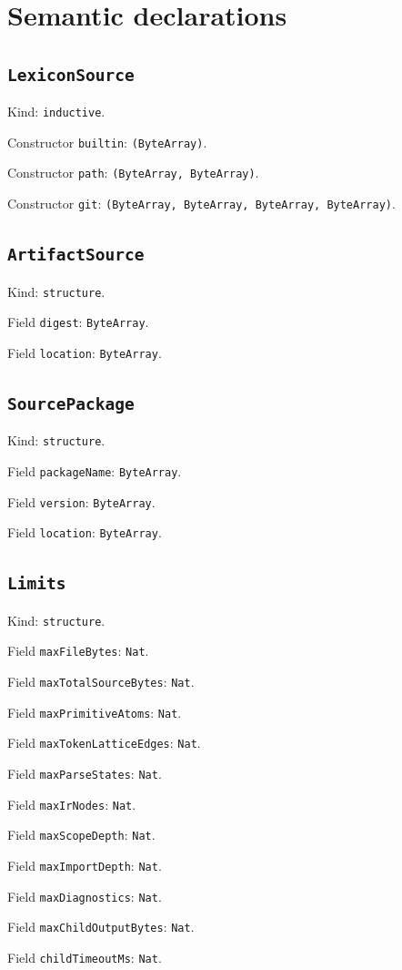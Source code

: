\documentclass[11pt]{article}
\begin{document}
\section*{Semantic declarations}
\subsection*{\texttt{LexiconSource}}
\noindent Kind: \texttt{inductive}.\par
\noindent Constructor \texttt{builtin}: \texttt{(ByteArray)}.\par
\noindent Constructor \texttt{path}: \texttt{(ByteArray, ByteArray)}.\par
\noindent Constructor \texttt{git}: \texttt{(ByteArray, ByteArray, ByteArray, ByteArray)}.\par
\subsection*{\texttt{ArtifactSource}}
\noindent Kind: \texttt{structure}.\par
\noindent Field \texttt{digest}: \texttt{ByteArray}.\par
\noindent Field \texttt{location}: \texttt{ByteArray}.\par
\subsection*{\texttt{SourcePackage}}
\noindent Kind: \texttt{structure}.\par
\noindent Field \texttt{packageName}: \texttt{ByteArray}.\par
\noindent Field \texttt{version}: \texttt{ByteArray}.\par
\noindent Field \texttt{location}: \texttt{ByteArray}.\par
\subsection*{\texttt{Limits}}
\noindent Kind: \texttt{structure}.\par
\noindent Field \texttt{maxFileBytes}: \texttt{Nat}.\par
\noindent Field \texttt{maxTotalSourceBytes}: \texttt{Nat}.\par
\noindent Field \texttt{maxPrimitiveAtoms}: \texttt{Nat}.\par
\noindent Field \texttt{maxTokenLatticeEdges}: \texttt{Nat}.\par
\noindent Field \texttt{maxParseStates}: \texttt{Nat}.\par
\noindent Field \texttt{maxIrNodes}: \texttt{Nat}.\par
\noindent Field \texttt{maxScopeDepth}: \texttt{Nat}.\par
\noindent Field \texttt{maxImportDepth}: \texttt{Nat}.\par
\noindent Field \texttt{maxDiagnostics}: \texttt{Nat}.\par
\noindent Field \texttt{maxChildOutputBytes}: \texttt{Nat}.\par
\noindent Field \texttt{childTimeoutMs}: \texttt{Nat}.\par
\end{document}
